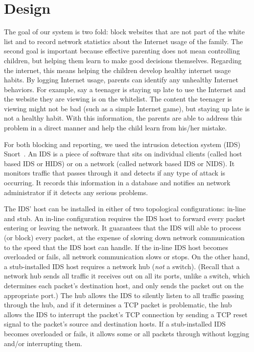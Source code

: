 
\section{Design}

The goal of our system is two fold: block websites that are not part of the
white list and to record network statistics about the Internet usage of the
family. 
%
The second goal is important because effective parenting does not mean
controlling children, but helping them learn to make good decisions
themselves.\cite{severe}
%
Regarding the internet, this means helping the children develop healthy
internet usage habits.
%
By logging Internet usage, parents can identify any unhealthy Internet
behaviors.
%
For example, say a teenager is staying up late to use the Internet and the
website they are viewing is on the whitelist.
%
The content the teenager is viewing might not be bad (such as a simple
Internet game), but staying up late is not a healthy habit.
%
With this information, the parents are able to address this problem in a
direct manner and help the child learn from his/her mistake.

For both blocking and reporting, we used the intrusion detection system (IDS)
Snort~\cite{snort}. An IDS is a piece of software that sits on individual
clients (called host based IDS or HIDS) or on a network (called network based
IDS or NIDS). It monitors traffic that passes through it and detects if any
type of attack is occurring. It records this information in a database
and notifies an network administrator if it detects any serious problems.

The IDS' host can be installed in either of two topological configurations:
in-line and stub.
%
An in-line configuration requires the IDS host to forward every packet
entering or leaving the network.
%
It guarantees that the IDS will able to process (or block) every packet, at
the expense of slowing down network communication to the speed that the IDS
host can handle.
%
If the in-line IDS host becomes overloaded or fails, all network communication
slows or stops.
%
On the other hand, a stub-installed IDS host requires a network hub (\emph{not} a
switch).
%
(Recall that a network hub sends all traffic it receives out on all its ports,
unlike a switch, which determines each packet's destination host, and only
sends the packet out on the appropriate port.)
%
The hub allows the IDS to silently listen to all traffic passing through the
hub, and if it determines a TCP packet is problematic, the hub allows the IDS
to interrupt the packet's TCP connection by sending a TCP reset signal to the
packet's source and destination hosts.
%
If a stub-installed IDS becomes overloaded or fails, it allows some or all
packets through without logging and/or interrupting them.

